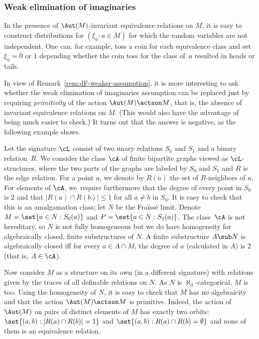 \subsubsection{Weak elimination of imaginaries} In the presence of $\Aut(M)$-invariant equivalence relations on $M$, it is easy to construct distributions for $(\xi_a : a \in M)$ for which the random variables are not independent. One can, for example, toss a coin for each equivalence class and set $\xi_a = 0$ or $1$ depending whether the coin toss for the class of~$a$ resulted in heads or tails.

In view of Remark~\ref{rem:dF-weaker-assumption}, it is more interesting to ask whether the weak elimination of imaginaries assumption can be replaced just by requiring \emph{primitivity} of the action $\Aut(M) \actson M$, that is, the absence of invariant equivalence relations on $M$. (This would also have the advantage of being much easier to check.) It turns out that the answer is negative, as the following example shows.

Let the signature $\cL$ consist of two unary relations $S_0$ and $S_1$ and a binary relation~$R$. We consider the class $\cA$ of finite bipartite graphs viewed as $\cL$-structures, where the two parts of the graphs are labeled by $S_0$ and $S_1$ and $R$ is the edge relation. For a point $a$, we denote by $R(a)$ the set of $R$-neighbors of $a$. For elements of $\cA$, we~require furthermore that the degree of every point in $S_0$ is $2$ and that $|R(a) \cap R(b)| \leq 1$ for all $a \neq b$ in $S_0$. It is easy to check that this is an amalgamation class; let $N$ be the Fraïssé limit. Denote $M = \set{a \in N : S_0(a)}$ and $P = \set{a \in N : S_1(a)}$. The class~$\cA$ is not hereditary, so $N$ is not fully homogeneous but we do have homogeneity for algebraically closed, finite substructures of $N$. A finite substructure $A \sub N$ is algebraically closed iff for every $a \in A \cap M$, the degree of $a$ (calculated in $A$) is $2$ (that is, $A \in \cA$).

Now consider $M$ as a structure on its own (in a different signature) with relations given by the traces of all definable relations on $N$. As $N$ is $\aleph_0$-categorical, $M$ is too. Using the homogeneity of $N$, it is easy to check that $M$ has no algebraicity and that the action $\Aut(M) \actson M$ is primitive. Indeed, the action of $\Aut(M)$ on pairs of distinct elements of $M$ has exactly two orbits: $\set{(a, b) : |R(a) \cap R(b)| = 1}$ and $\set{(a, b) : R(a) \cap R(b) = \emptyset}$ and none of them is an equivalence relation.

